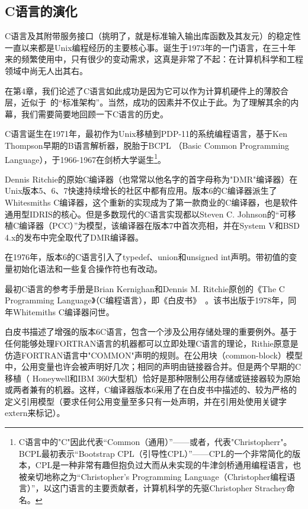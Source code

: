 \documentclass[12pt,oneside]{ctexbook}
\begin{document}
\begin{common-format}
\section{C语言的演化}
C语言及其附带服务接口（挑明了，就是标准输入输出库函数及其友元）的稳定性一直以来都是Unix编程经历的主要核心事。诞生于1973年的一门语言，在三十年来的频繁使用中，只有很少的变动需求，这真是非常了不起：在计算机科学和工程领域中尚无人出其右。

在第4章，我们论述了C语言如此成功是因为它可以作为计算机硬件上的薄胶合层，近似于~\cite{BlaauwBrooks}的“标准架构”。当然，成功的因素并不仅止于此。为了理解其余的内幕，我们需要简要地回顾一下C语言的历史。

C语言诞生在1971年，最初作为Unix移植到PDP-11的系统编程语言，基于Ken Thompson早期的B语言解析器，脱胎于BCPL （Basic Common Programming Language），于1966-1967在剑桥大学诞生\footnote{C语言中的"C"因此代表“Common（通用）”——或者，代表"Christopherr"。BCPL最初表示“Bootstrap CPL（引导性CPL）”——CPL的一个非常简化的版本，CPL是一种非常有趣但抱负过大而从未实现的牛津剑桥通用编程语言，也被亲切地称之为“Christopher's Programming Language（Christopher编程语言）”，以这门语言的主要贡献者，计算机科学的先驱Christopher Strachey命名。}。

Dennis Ritchie的原始C编译器（也常常以他名字的首字母称为"DMR"编译器）在Unix版本5、6、7快速持续增长的社区中都有应用。版本6的C编译器派生了Whitesmiths C编译器，这个重新的实现成为了第一款商业的C编译器，也是软件通用型IDRIS的核心。但是多数现代的C语言实现都以Steven C. Johnson的“可移植C编译器（PCC）”为模型，该编译器在版本7中首次亮相，并在System V和BSD 4.x的发布中完全取代了DMR编译器。

在1976年，版本6的C语言引入了typedef、union和unsigned int声明。带初值的变量初始化语法和一些复合操作符也有改动。

最初C语言的参考手册是Brian Kernighan和Dennis M. Ritchie原创的《The C Programming Language》（C编程语言），即《白皮书》~\cite{Kernighan-Ritchie}。该书出版于1978年，同年Whitemiths C编译器问世。

白皮书描述了增强的版本6C语言，包含一个涉及公用存储处理的重要例外。基于任何能够处理FORTRAN语言的机器都可以立即处理C语言的理论，Rithie原意是仿造FORTRAN语言中"COMMON"声明的规则。在公用块（common-block）模型中，公用变量也许会被声明好几次；相同的声明由链接器合并。但是两个早期的C移植（ Honeywell和IBM 360大型机）恰好是那种限制公用存储或链接器较为原始或两者兼有的机器。这样，C编译器版本6采用了在白皮书中描述的、较为严格的定义引用模型（要求任何公用变量至多只有一处声明，并在引用处使用关键字extern来标记）。


\end{common-format}
\end{document}
